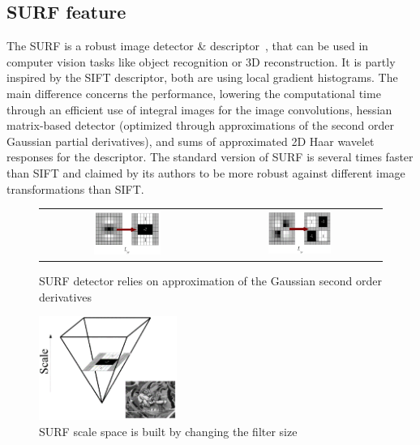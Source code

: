 \subsection{SURF feature}

The \gls{SURF} is a robust image detector \& descriptor~\cite{surf}, that can be used in computer vision tasks like object recognition or 3D reconstruction. It is partly inspired by the \gls{SIFT} descriptor, both are using local gradient histograms. The main difference concerns the performance, lowering the computational time through an efficient use of integral images for the image convolutions, hessian matrix-based detector (optimized through approximations of the second order Gaussian partial derivatives), and sums of approximated 2D Haar wavelet responses for the descriptor. The standard version of \gls{SURF} is several times faster than \gls{SIFT} and claimed by its authors to be more robust against different image transformations than \gls{SIFT}.

\begin{figure}[H]
\centering
 \begin{tabular}{cc}
 \includegraphics[width=0.4\textwidth]{figures/surf_lyy} &
 \includegraphics[width=0.4\textwidth]{figures/surf_lxy}
 \end{tabular}
\caption{SURF detector relies on approximation of the Gaussian second order derivatives}
\end{figure}

\begin{figure}[H]
\centering
\includegraphics[width=0.4\textwidth]{figures/surf_scale}
\caption{SURF scale space is built by changing the filter size}
\end{figure}

